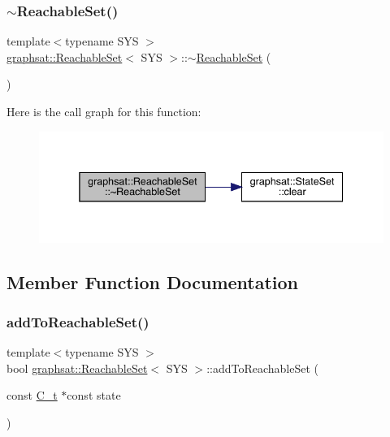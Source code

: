 \subsubsection{\texorpdfstring{$\sim$ReachableSet()}{~ReachableSet()}}
{\footnotesize\ttfamily template$<$typename S\+YS $>$ \\
\mbox{\hyperlink{classgraphsat_1_1_reachable_set}{graphsat\+::\+Reachable\+Set}}$<$ S\+YS $>$\+::$\sim$\mbox{\hyperlink{classgraphsat_1_1_reachable_set}{Reachable\+Set}} (\begin{DoxyParamCaption}{ }\end{DoxyParamCaption})\hspace{0.3cm}{\ttfamily [inline]}}

Here is the call graph for this function\+:
\nopagebreak
\begin{figure}[H]
\begin{center}
\leavevmode
\includegraphics[width=338pt]{classgraphsat_1_1_reachable_set_abb174d0e553c9dc98ee5707fb9d72db5_cgraph}
\end{center}
\end{figure}


\subsection{Member Function Documentation}
\mbox{\label{classgraphsat_1_1_reachable_set_acee5be3f5d294e0339c4bf3b9e690f51}} 
\subsubsection{\texorpdfstring{addToReachableSet()}{addToReachableSet()}}
{\footnotesize\ttfamily template$<$typename S\+YS $>$ \\
bool \mbox{\hyperlink{classgraphsat_1_1_reachable_set}{graphsat\+::\+Reachable\+Set}}$<$ S\+YS $>$\+::add\+To\+Reachable\+Set (\begin{DoxyParamCaption}\item[{const \mbox{\hyperlink{classgraphsat_1_1_reachable_set_a0b7981a216ec4c46be913e08d5f0cd07}{C\+\_\+t}} $\ast$const}]{state }\end{DoxyParamCaption})\hspace{0.3cm}{\ttfamily [inline]}}

